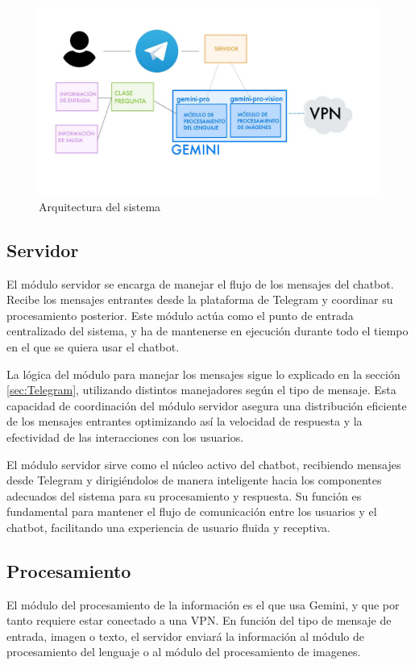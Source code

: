 \begin{figure}[h]
	\centering
	\includegraphics[width=1\textwidth]{Imagenes/arquitectura}
	\caption{Arquitectura del sistema}
	\label{fig:arquitectura}
\end{figure}

\subsection{Servidor}

El módulo servidor se encarga de manejar el flujo de los mensajes del chatbot. Recibe los mensajes entrantes desde la plataforma de Telegram y coordinar su procesamiento posterior. Este módulo actúa como el punto de entrada centralizado del sistema, y ha de mantenerse en ejecución durante todo el tiempo en el que se quiera usar el chatbot.

La lógica del módulo para manejar los mensajes sigue lo explicado en la sección \ref{sec:Telegram}, utilizando distintos manejadores según el tipo de mensaje.  Esta capacidad de coordinación del módulo servidor asegura una distribución eficiente de los mensajes entrantes optimizando así la velocidad de respuesta y la efectividad de las interacciones con los usuarios.

El módulo servidor sirve como el núcleo activo del chatbot, recibiendo mensajes desde Telegram y dirigiéndolos de manera inteligente hacia los componentes adecuados del sistema para su procesamiento y respuesta. Su función es fundamental para mantener el flujo de comunicación entre los usuarios y el chatbot, facilitando una experiencia de usuario fluida y receptiva.

\subsection{Procesamiento}
El módulo del procesamiento de la información es el que usa Gemini, y que por tanto requiere estar conectado a una VPN. En función del tipo de mensaje de entrada, imagen o texto, el servidor enviará la información al módulo de procesamiento del lenguaje o al módulo del procesamiento de imagenes.
